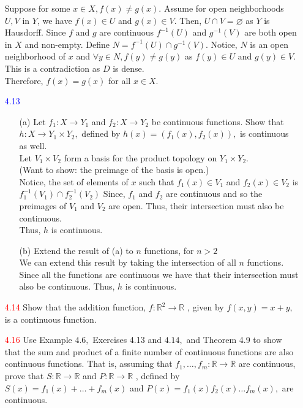 \documentclass[12pt]{article}
\begin{document}
\begin{enumerate}
	Suppose for some $ x\in X, f(x)\not= g(x) $. Assume for open neighborhoods $ U,V $ in $ Y $, we have $ f(x)\in U $ and $ g(x) \in V $. Then, $ U\cap V = \varnothing $ as $ Y $ is Hausdorff. Since $ f $ and $ g $ are continuous $ f^{-1}(U) $ and $ g^{-1}(V) $ are both open in $ X $ and non-empty. Define $ N= f^{-1}(U) \cap g^{-1}(V)$. Notice, $ N $ is an open neighborhood of $ x $ and $ \forall y\in N, f(y)\not= g(y) $ as $ f(y)\in U $ and $ g(y)\in V $. This is a contradiction as $ D $ is dense.\\
	Therefore, $ f(x)=g(x) $ for all $ x \in X $.
	
	\item[\textcolor{blue}{4.13}]
	  \begin{enumerate}
	  	\item[(a)] Let $f _ { 1 } : X \rightarrow Y _ { 1 }$ and $f _ { 2 } : X \rightarrow Y _ { 2 }$ be continuous functions. Show that
	  	$h : X \rightarrow Y _ { 1 } \times Y _ { 2 } ,$ defined by $h ( x ) = \left( f _ { 1 } ( x ) , f _ { 2 } ( x ) \right) ,$ is continuous as well.\\
	  	Let $ V_1 \times V_2 $ form a basis for the product topology on $ Y_1\times Y_2 $. \\
	  	(Want to show: the preimage of the basis is open.)\\
	  	Notice, the set of elements of $ x $ such that $ f_1(x)\in V_1 $ and $ f_2(x)\in V_2 $ is $ f^{-1}_1(V_1)\cap f^{-1}_2(V_2) $ Since, $ f_1 $ and $ f_2 $ are continuous and so the preimages of $ V_1 $ and $ V_2 $ are open. Thus, their intersection must also be continuous.\\
	  	Thus, $ h $ is continuous. 
	  	\item[(b)] Extend the result of (a) to $n$ functions, for $n > 2$\\
	  	We can extend this result by taking the intersection of all $ n $ functions. Since all the functions are continuous we have that their intersection must also be continuous. Thus, $ h $ is continuous.
	  \end{enumerate}
	
	\item[\textcolor{red}{4.14}] Show that the addition function, $f : \mathbb { R } ^ { 2 } \rightarrow \mathbb { R }$ , given by $f ( x , y ) = x + y ,$ is a continuous function.
	
	\item[\textcolor{red}{4.16}] Use Example $4.6 ,$ Exercises 4.13 and $4.14 ,$ and Theorem 4.9 to show that the
	sum and product of a finite number of continuous functions are also continuous functions. That is, assuming that $f _ { 1 } , \ldots , f _ { m } : \mathbb { R } \rightarrow \mathbb { R }$ are continuous, prove that $S : \mathbb { R } \rightarrow \mathbb { R }$ and $P : \mathbb { R } \rightarrow \mathbb { R }$ , defined by $S ( x ) = f _ { 1 } ( x ) + \ldots + f _ { m } ( x )$ and $P ( x ) = f _ { 1 } ( x ) f _ { 2 } ( x ) \ldots f _ { m } ( x ) ,$ are continuous.
	

\end{enumerate}
\end{document}
